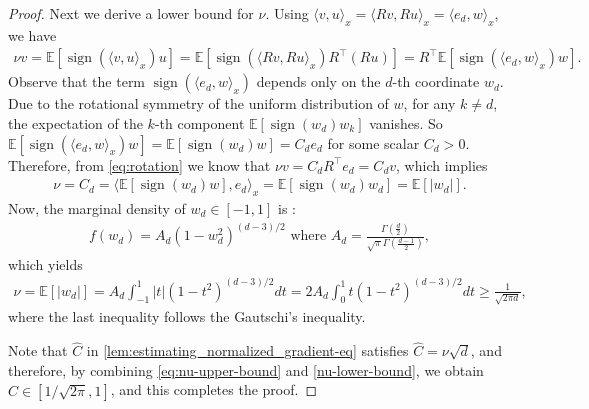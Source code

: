 \documentclass{article}
\theoremstyle{plain}
\theoremstyle{definition}
\theoremstyle{remark}
\begin{document}
\begin{proof}
Next we derive a lower bound for $\nu$. Using $\langle v,u\rangle_x = \langle Rv,Ru\rangle_x = \langle e_d, w\rangle_x$, we have
\begin{align}\label{eq:rotation}
\nu v = \mathbb{E}[\operatorname{sign}(\langle v,u\rangle_x)u]
=\mathbb{E}[\operatorname{sign}(\langle Rv,Ru\rangle_x)R^{\top}(Ru)]
=R^{\top}\mathbb{E}[\operatorname{sign}(\langle e_d,w\rangle_x)w].
\end{align}
Observe that the term $\operatorname{sign}(\langle e_d, w\rangle_x)$ depends only on the $d$-th coordinate $w_d$. Due to the rotational symmetry of the uniform distribution of $w$, for any $k \neq d$, the expectation of the $k$-th component $\mathbb{E}[\operatorname{sign}(w_d)w_k]$ vanishes. 
So $\mathbb{E}[\operatorname{sign}(\langle e_d,w\rangle_x)w]=\mathbb{E}[\operatorname{sign}(w_d)w]=C_d e_d$ for some scalar $C_d>0$.
Therefore, from \eqref{eq:rotation} we know that $\nu v = C_d R^\top e_d = C_d v$, which implies 
\begin{align*}
\nu=C_d=\langle \mathbb{E}[\operatorname{sign}(w_d)w],e_d\rangle_x=\mathbb{E}[\operatorname{sign}(w_d)w_d]=\mathbb{E}[|w_d|].
\end{align*}
Now, the marginal density of $ w_d \in [-1,1] $ is \citep{vershynin2009high}:
\begin{align*}
    f(w_d) = A_d (1 - w_d^2)^{(d - 3)/2}  \mbox{ where } A_d = \frac{\Gamma\left(\frac{d}{2}\right)}{\sqrt{\pi}  \Gamma\left(\frac{d-1}{2}\right)},
\end{align*}
which yields 
\begin{align}\label{nu-lower-bound}
    \nu=\mathbb{E}[|w_d|]=A_d\int_{-1}^1|t|(1 - t^2)^{(d - 3)/2}dt=2A_d\int_{0}^1t(1 - t^2)^{(d - 3)/2}dt
    \geq \frac{1}{\sqrt{2\pi d}},
\end{align}
where the last inequality follows the Gautschi’s inequality.

Note that $\hat{C}$ in \eqref{lem:estimating_normalized_gradient-eq} satisfies $\hat{C} = \nu \sqrt{d}$, and therefore, by combining \eqref{eq:nu-upper-bound} and \eqref{nu-lower-bound}, we obtain $\hat{C} \in [1/\sqrt{2\pi},1]$, and this completes the proof. 
\end{proof}
\end{document}
